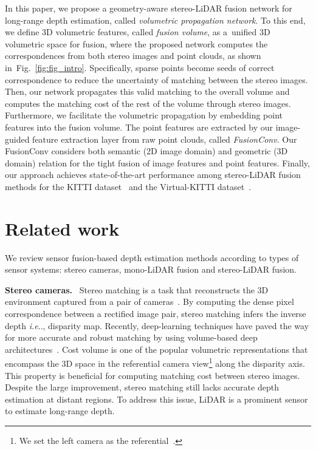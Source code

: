 \documentclass[letterpaper, 10 pt, conference]{ieeeconf}
\makeatletter
\DeclareRobustCommand\onedot{\futurelet\@let@token\@onedot}
\def\@onedot{\ifx\@let@token.\else.\null\fi\xspace}
\def\ie{\emph{i.e}\onedot} \def\Ie{{I.e}\onedot}
\newcommand{\Fref}[1]{Fig.~\textcolor{blue}{\ref{#1}}}
\makeatother
\begin{document}
In this paper, we propose a geometry-aware stereo-LiDAR fusion network for long-range depth estimation, called \emph{volumetric propagation network}. To this end, we define 3D volumetric features, called \emph{fusion volume}, as a~unified 3D volumetric space for fusion, where the proposed network computes the correspondences from both stereo images and point clouds, as shown in~\Fref{fig:fig_intro}. Specifically, sparse points become seeds of correct correspondence to reduce the uncertainty of matching between the stereo images. Then, our network propagates this valid matching to the overall volume and computes the matching cost of the rest of the volume through stereo images. 
Furthermore, we facilitate the volumetric propagation by embedding point features into the fusion volume. The point features are extracted by our image-guided feature extraction layer from raw point clouds, called \emph{FusionConv}. Our FusionConv considers both semantic (2D image domain) and geometric (3D domain) relation for the tight fusion of image features and point features. Finally, our approach achieves state-of-the-art performance among stereo-LiDAR fusion methods for the KITTI dataset~\cite{kitti-completion} and the Virtual-KITTI dataset~\cite{virtual-kitti}.

   


\section{Related work}
\label{sec:Related works}
We review sensor fusion-based depth estimation methods according to types of sensor systems: stereo cameras, mono-LiDAR fusion and stereo-LiDAR fusion.

\vspace{1mm} \noindent \textbf{Stereo cameras.} \ 
Stereo matching is a task that reconstructs the 3D environment captured from a pair of cameras~\cite{geometry}. By computing the dense pixel correspondence between a rectified image pair, stereo matching infers the inverse depth \ie, disparity map. Recently, deep-learning techniques have paved the way for more accurate and robust matching by using volume-based deep architectures~\cite{gcnet,psmnet,dpsnet}. 
Cost volume is one of the popular volumetric representations that encompass the 3D space in the referential camera view\footnote{We set the left camera as the referential~\cite{geometry}.} along the disparity axis. This property is beneficial for computing matching cost between stereo images. 
Despite the large improvement, stereo matching still lacks accurate depth estimation at distant regions. 
To address this issue, LiDAR is a prominent sensor to estimate long-range depth.
\end{document}
